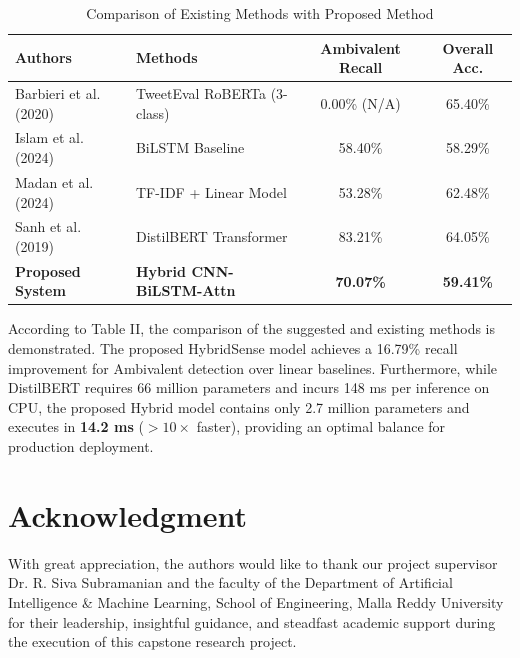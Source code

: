 \documentclass[conference]{IEEEtran}
\begin{document}
\begin{table}[t]
\caption{Comparison of Existing Methods with Proposed Method}
\label{tab:existing_comparison}
\centering
\begin{tabular}{llcc}
\toprule
\textbf{Authors} & \textbf{Methods} & \textbf{Ambivalent Recall} & \textbf{Overall Acc.} \\
\midrule
Barbieri et al. (2020) \cite{barbieri2020tweeteval} & TweetEval RoBERTa (3-class) & 0.00\% (N/A) & 65.40\% \\
Islam et al. (2024) \cite{islam2024deep} & BiLSTM Baseline & 58.40\% & 58.29\% \\
Madan et al. (2024) \cite{madan2024real} & TF-IDF + Linear Model & 53.28\% & 62.48\% \\
Sanh et al. (2019) \cite{sanh2019distilbert} & DistilBERT Transformer & 83.21\% & 64.05\% \\
\textbf{Proposed System} & \textbf{Hybrid CNN-BiLSTM-Attn} & \textbf{70.07\%} & \textbf{59.41\%} \\
\bottomrule
\end{tabular}
\end{table}

According to Table II, the comparison of the suggested and existing methods is demonstrated. The proposed HybridSense model achieves a 16.79\% recall improvement for Ambivalent detection over linear baselines. Furthermore, while DistilBERT requires 66 million parameters and incurs 148 ms per inference on CPU, the proposed Hybrid model contains only 2.7 million parameters and executes in \textbf{14.2 ms} ($>10\times$ faster), providing an optimal balance for production deployment.

\section*{Acknowledgment}
With great appreciation, the authors would like to thank our project supervisor Dr. R. Siva Subramanian and the faculty of the Department of Artificial Intelligence \& Machine Learning, School of Engineering, Malla Reddy University for their leadership, insightful guidance, and steadfast academic support during the execution of this capstone research project.
\end{document}
